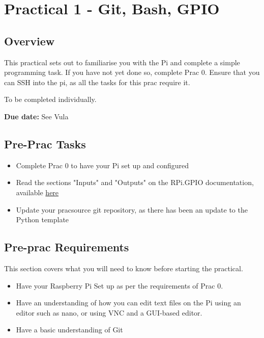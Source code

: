 \newpage
\section{Practical 1 - Git, Bash, GPIO}
\label{sec:Prac1}
\subsection{Overview}
This practical sets out to familiarise you with the Pi and complete a simple programming task. If you have not yet done so, complete Prac 0. Ensure that you can SSH into the pi, as all the tasks for this prac require it.

To be completed individually. 

\textbf{Due date:} See Vula

\subsection{Pre-Prac Tasks}
\begin{itemize}
\itemsep0em 
    \item Complete Prac 0 to have your Pi set up and configured
    \item Read the sections "Inputs" and "Outputs" on the RPi.GPIO documentation, available \href{https://sourceforge.net/p/raspberry-gpio-python/wiki/Examples/}{here}
    \item Update your pracsource git repository, as there has been an update to the Python template
\end{itemize}

\subsection{Pre-prac Requirements}
This section covers what you will need to know before starting the practical.
\begin{itemize}
    \itemsep0em 
    \item Have your Raspberry Pi Set up as per the requirements of Prac 0.
    \item Have an understanding of how you can edit text files on the Pi using an editor such as nano, or using VNC and a GUI-based editor.
    \item Have a basic understanding of Git
\end{itemize}

